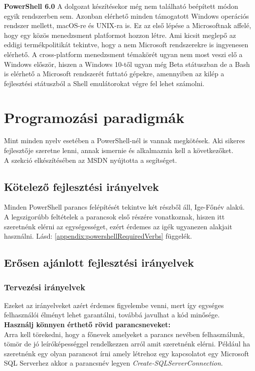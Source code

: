 \documentclass[12pt,oneside,justify,table]{book}
\begin{document}
\noindent\textbf{PowerShell 6.0}
\newline A dolgozat készítésekor még nem található beépített módon egyik rendszerben sem. Azonban elérhető minden támogatott Windows operációs rendszer mellett, macOS-re és UNIX-ra is. Ez az első lépése a Microsoftnak affelé, hogy egy közös menedzsment platformot hozzon létre. Ami kicsit meglepő az eddigi termékpolitikát tekintve, hogy a nem Microsoft rendszerekre is ingyenesen elérhető.
A cross-platform menedzsment témakörét ugyan nem most veszi elő a Windows először, hiszen a Windows 10-től ugyan még Beta státuszban de a Bash is elérhető a Microsoft rendszerét futtató gépekre, amennyiben az kilép a fejlesztési státuszból a Shell emulátorokat végre fel lehet számolni.

\section{Programozási paradigmák}
Mint minden nyelv esetében a PowerShell-nél is vannak megkötések. Aki sikeres fejlesztője szeretne lenni, annak ismernie és alkalmaznia kell a következőket. \\

\noindent A szekció elkészítésében az MSDN nyújtotta a segítséget. \cite{PowerShellGuidelines}
\subsection{Kötelező fejlesztési irányelvek}
Minden PowerShell parancs felépítését tekintve két részből áll, Ige-Főnév alakú. A legszigorúbb feltételek a parancsok első részére vonatkoznak, hiszen itt szeretnénk elérni az egységességet, ezért érdemes az igék ugyanezen alakjait használni. 
Lásd: \ref{appendix:powershellRequiredVerbs} függelék.
\subsection{Erősen ajánlott fejlesztési irányelvek}
\subsubsection{Tervezési irányelvek}
Ezeket az irányelveket azért érdemes figyelembe venni, mert így egységes felhasználói élményt lehet garantálni, továbbá javulhat a kód minősége. \\

\noindent \textbf{Használj könnyen érthető rövid parancsneveket:}\\
Arra kell törekedni, hogy a főnevek amelyeket a parancs nevében felhasználunk, tömör de jó leíróképességgel rendelkezzen arról amit szeretnénk elérni. Például ha szeretnénk egy olyan parancsot írni amely létrehoz egy kapcsolatot egy Microsoft SQL Serverhez akkor a parancsnév legyen \textit{Create-SQLServerConnection}. \\
\end{document}
